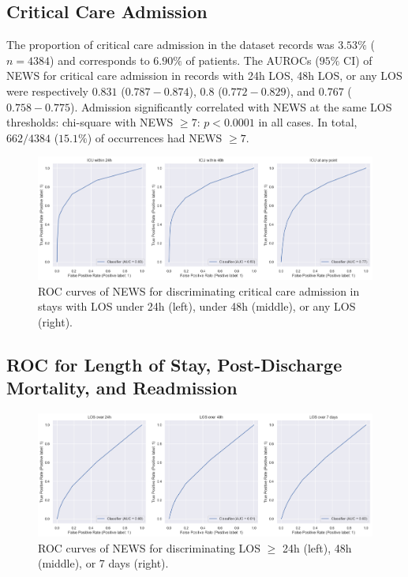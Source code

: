 \documentclass[10pt,journal, compsoc]{IEEEtran}
\begin{document}
\subsection{Critical Care Admission}
The proportion of critical care admission in the dataset records was $3.53\%$ ($n=4384$) and corresponds to $6.90\%$ of patients. The AUROCs ($95\%$ CI) of NEWS for critical care admission in records with 24h LOS, 48h LOS, or any LOS were respectively $0.831$ ($0.787-0.874$), $0.8$ ($0.772-0.829$), and $0.767$ ($0.758-0.775$). Admission significantly correlated with NEWS at the same LOS thresholds: chi-square with NEWS $\geq 7$: $p < 0.0001$ in all cases. In total, $662/4384$ ($15.1\%$) of occurrences had NEWS $\geq 7$.
\begin{figure}[htbp]
    \centering
    \includegraphics[width=\textwidth]{img/criticalcare_roc.png}
    \caption{ROC curves of NEWS for discriminating critical care admission in stays with LOS under 24h (left), under 48h (middle), or any LOS (right).}
    \label{fig:criticalcare_roc}
\end{figure}

\subsection{ROC for Length of Stay, Post-Discharge Mortality, and Readmission}
\label{appendix:rocplots}
\begin{figure}[htbp]
    \centering
    \includegraphics[width=\textwidth]{img/los_roc.png}
    \caption{ROC curves of NEWS for discriminating LOS $\geq$ 24h (left), 48h (middle), or 7 days (right).}
    \label{fig:los_roc}
\end{figure}
\end{document}
